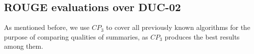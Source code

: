 \documentclass[a4paper,twoside]{article}
\begin{document}
%

\subsection{ROUGE evaluations over DUC-02}

As mentioned before, we use %
$CP_3$ to cover all previously known algorithms for the purpose of comparing qualities of summaries, as
$CP_3$ produces the best results among them. %
\end{document}
